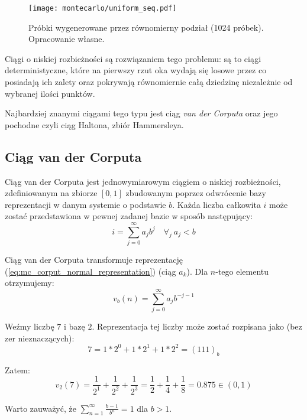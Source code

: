 \documentclass[../main.tex]{subfiles}
\begin{document}
\begin{figure}[h]
  \centering
  \texttt{[image: montecarlo/uniform\_seq.pdf]}
  \caption{Próbki wygenerowane przez równomierny podział (1024 próbek). Opracowanie własne.}
  \label{fig:UniformSamples}
\end{figure}

Ciągi o niskiej rozbieżności są rozwiązaniem tego problemu: są to ciągi deterministyczne, które na pierwszy rzut oka wydają się losowe przez co posiadają ich zalety oraz pokrywają równomiernie całą dziedzinę niezależnie od wybranej ilości punktów.

Najbardziej znanymi ciągami tego typu jest ciąg \textit{van der Corputa} oraz jego pochodne czyli ciąg Haltona, zbiór Hammersleya.

\subsection{Ciąg van der Corputa}

Ciąg van der Corputa \cite{WongSamplingWH} jest jednowymiarowym ciągiem o niskiej rozbieżności, zdefiniowanym na zbiorze $[0,1]$ zbudowanym poprzez odwrócenie bazy reprezentacji w danym systemie o podstawie $b$. Każda liczba całkowita $i$ może zostać przedstawiona w pewnej zadanej bazie w sposób następujący:
\begin{equation}
    i = \sum_{j=0}^{\infty} {a_j b^j} \quad \forall_{j}\: a_j < b
    \label{eq:mc_corput_normal_representation}
\end{equation}

Ciąg van der Corputa transformuje reprezentację (\ref{eq:mc_corput_normal_representation}) (ciąg $a_k$). Dla $n$-tego elementu otrzymujemy:
\begin{equation}
    v_b(n) = \sum_{j=0}^{\infty} {a_j b^{-j-1}} 
\end{equation}

\begin{example}
  Weźmy liczbę $7$ i bazę $2$. Reprezentacja tej liczby może zostać rozpisana jako (bez zer nieznaczących):
  \[ 
  7 = 1 * 2^0 + 1 * 2^1 + 1 * 2^2 = (111)_{b} 
  \]

  \noindent Zatem:
  \[
    v_{2}(7)
      = \frac{1}{2^{1}} + \frac{1}{2^{2}} + \frac{1}{2^{3}}
      = \frac{1}{2} + \frac{1}{4} + \frac{1}{8}
      = 0.875
      \in (0,1)
  \]
\end{example}

Warto zauważyć, że $\sum_{n=1}^{\infty} \frac{b-1}{b^n} = 1$ dla $b>1$.
\end{document}
